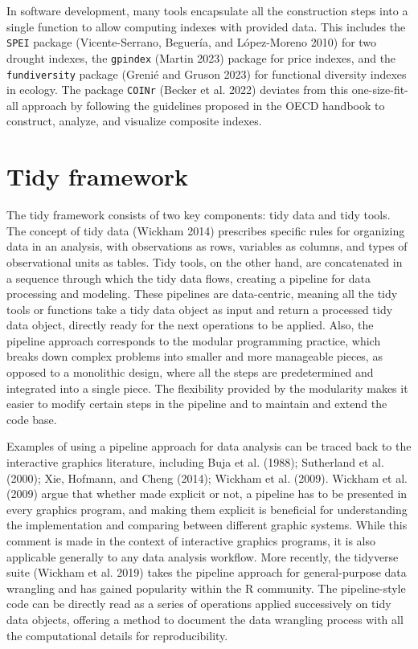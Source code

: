 \documentclass[
]{interact}
\begin{document}
In software development, many tools encapsulate all the construction
steps into a single function to allow computing indexes with provided
data. This includes the \texttt{SPEI} package (Vicente-Serrano,
Beguería, and López-Moreno 2010) for two drought indexes, the
\texttt{gpindex} (Martin 2023) package for price indexes, and the
\texttt{fundiversity} package (Grenié and Gruson 2023) for functional
diversity indexes in ecology. The package \texttt{COINr} (Becker et al.
2022) deviates from this one-size-fit-all approach by following the
guidelines proposed in the OECD handbook to construct, analyze, and
visualize composite indexes.

\hypertarget{sec-tidy}{%
\section{Tidy framework}\label{sec-tidy}}

The tidy framework consists of two key components: tidy data and tidy
tools. The concept of tidy data (Wickham 2014) prescribes specific rules
for organizing data in an analysis, with observations as rows, variables
as columns, and types of observational units as tables. Tidy tools, on
the other hand, are concatenated in a sequence through which the tidy
data flows, creating a pipeline for data processing and modeling. These
pipelines are data-centric, meaning all the tidy tools or functions take
a tidy data object as input and return a processed tidy data object,
directly ready for the next operations to be applied. Also, the pipeline
approach corresponds to the modular programming practice, which breaks
down complex problems into smaller and more manageable pieces, as
opposed to a monolithic design, where all the steps are predetermined
and integrated into a single piece. The flexibility provided by the
modularity makes it easier to modify certain steps in the pipeline and
to maintain and extend the code base.

Examples of using a pipeline approach for data analysis can be traced
back to the interactive graphics literature, including Buja et al.
(1988); Sutherland et al. (2000); Xie, Hofmann, and Cheng (2014);
Wickham et al. (2009). Wickham et al. (2009) argue that whether made
explicit or not, a pipeline has to be presented in every graphics
program, and making them explicit is beneficial for understanding the
implementation and comparing between different graphic systems. While
this comment is made in the context of interactive graphics programs, it
is also applicable generally to any data analysis workflow. More
recently, the tidyverse suite (Wickham et al. 2019) takes the pipeline
approach for general-purpose data wrangling and has gained popularity
within the R community. The pipeline-style code can be directly read as
a series of operations applied successively on tidy data objects,
offering a method to document the data wrangling process with all the
computational details for reproducibility.
\end{document}
